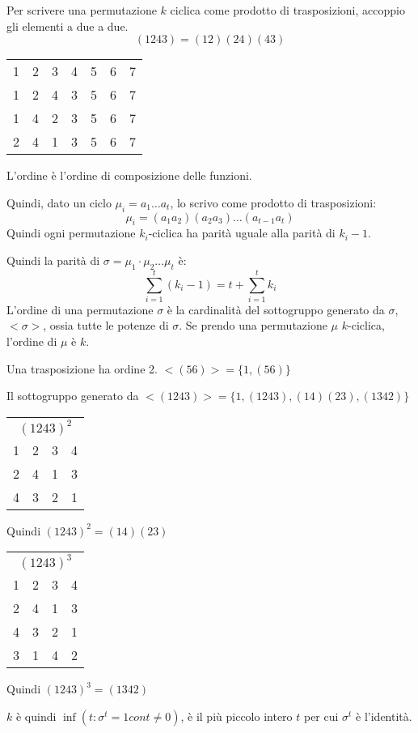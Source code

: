 Per scrivere una permutazione $k$ ciclica come prodotto di trasposizioni, accoppio gli elementi a due a due.
\[
(1 2 4 3) = (1 2) (2 4) (4 3)
\]
\begin{tabular}{*{7}{c}}
1 & 2 & 3 & 4 & 5 & 6 & 7 \\
1 & 2 & 4 & 3 & 5 & 6 & 7 \\
1 & 4 & 2 & 3 & 5 & 6 & 7 \\
2 & 4 & 1 & 3 & 5 & 6 & 7
\end{tabular}

L'ordine \`e l'ordine di composizione delle funzioni.

Quindi, dato un ciclo $\mu_i = a_1 \dots a_t$, lo scrivo come prodotto di trasposizioni:
\[
\mu_i = (a_1 a_2) (a_2 a_3) \dots (a_{t-1} a_t)
\]
Quindi ogni permutazione $k_i$-ciclica ha parit\`a uguale alla parit\`a di $k_i - 1$.

Quindi la parit\`a di $\sigma = \mu_1 \cdot \mu_2 \dots \mu_t$ \`e:
\[
\sum_{i = 1}^{t} (k_i - 1) = t + \sum_{i = 1}^{t} k_i
\]
L'ordine di una permutazione $\sigma$ \`e la cardinalit\`a del sottogruppo generato da $\sigma$, $< \sigma >$, ossia tutte le potenze di $\sigma$. Se prendo una permutazione $\mu$ $k$-ciclica, l'ordine di $\mu$ \`e $k$.

Una trasposizione ha ordine 2. $< (5 6) > = \{ 1, (5 6) \}$

Il sottogruppo generato da $< (1 2 4 3) > = \{ 1, (1 2 4 3), (1 4) (2 3), (1 3 4 2) \}$

\begin{tabular}{*{4}{c}}
\multicolumn{4}{c}{$(1 2 4 3)^2$} \\
1 & 2 & 3 & 4 \\
2 & 4 & 1 & 3 \\
4 & 3 & 2 & 1
\end{tabular}

Quindi $(1 2 4 3)^2 = (1 4) (2 3)$

\begin{tabular}{*{4}{c}}
\multicolumn{4}{c}{$(1 2 4 3)^3$} \\
1 & 2 & 3 & 4 \\
2 & 4 & 1 & 3 \\
4 & 3 & 2 & 1 \\
3 & 1 & 4 & 2
\end{tabular}

Quindi $(1 2 4 3)^3 = (1 3 4 2)$

$k$ \`e quindi $\inf (t : \sigma^t = 1 con t \neq 0)$, \`e il pi\`u piccolo intero $t$ per cui $\sigma^t$ \`e l'identit\`a.

